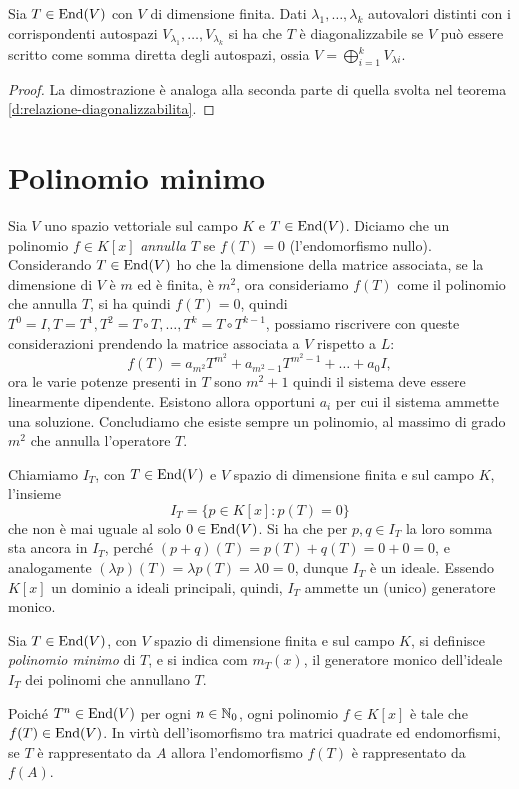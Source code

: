 \begin{teorema}
	Sia $T\in \operatorname{End}(V)$ con $V$ di dimensione finita.
	Dati $\lambda_1,\dots,\lambda_k$ autovalori distinti con i corrispondenti autospazi $V_{\lambda_1},\dots,V_{\lambda_k}$ si ha che $T$ è diagonalizzabile se $V$ può essere scritto come somma diretta degli autospazi, ossia $V =\bigoplus_{i=1}^k V_{\lambda i}$.
\end{teorema}
\begin{proof}
	La dimostrazione è analoga alla seconda parte di quella svolta nel teorema \ref{d:relazione-diagonalizzabilita}.
\end{proof}

\section{Polinomio minimo}
Sia $V$ uno spazio vettoriale sul campo $K$ e $T\in \operatorname{End}(V)$.
Diciamo che un polinomio $f\in K[x]$ \emph{annulla} $T$ se $f(T) = 0$ (l'endomorfismo nullo).
Considerando $T\in \operatorname{End}(V)$ ho che la dimensione della matrice associata, se la dimensione di $V$ è $m$ ed è finita, è $m^2$, ora consideriamo $f(T)$ come il polinomio che annulla $T$, si ha quindi $f(T) = 0$, quindi $T^0 = I,T=T^1, T^2=T\circ T, \dots, T^k = T\circ T^{k-1}$, possiamo riscrivere con queste considerazioni prendendo la matrice associata a $V$ rispetto a $L$:
\begin{equation*}
	f(T) = a_{m^2}T^{m^2} +a_{m^2-1}T^{m^2-1}+\dots+a_0I,
\end{equation*}
ora le varie potenze presenti in $T$ sono $m^2+1$ quindi il sistema deve essere linearmente dipendente.
Esistono allora opportuni $a_i$ per cui il sistema ammette una soluzione.
Concludiamo che esiste sempre un polinomio, al massimo di grado $m^2$ che annulla l'operatore $T$.

Chiamiamo $I_T$, con  $T\in \operatorname{End}(V)$ e $V$ spazio di dimensione finita e sul campo $K$, l'insieme
\begin{equation*}
	I_T = \{ p\in K[x]\colon p(T) = 0 \}
\end{equation*}
che non è mai uguale al solo $0\in \operatorname{End}(V)$.
Si ha che per $p,q\in I_T$ la loro somma sta ancora in $I_T$, perch\'e $(p+q)(T)=p(T)+q(T)=0+0=0$, e analogamente $(\lambda p)(T)=\lambda p(T)=\lambda 0=0$, dunque $I_T$ è un ideale.
Essendo $K[x]$ un dominio a ideali principali, quindi, $I_T$ ammette un (unico) generatore monico.
\begin{definizione} \label{d:polinomio-minimo}
	Sia $T\in \operatorname{End}(V)$, con $V$ spazio di dimensione finita e sul campo $K$, si definisce \emph{polinomio minimo} di $T$, e si indica com $m_T(x)$, il generatore monico dell'ideale $I_T$ dei polinomi che annullano $T$.
\end{definizione}
Poich\'e $T^n\in\operatorname{End}(V)$ per ogni $n\in\mathbb{N}_0$, ogni polinomio $f\in K[x]$ è tale che $f(T)\in\operatorname{End}(V)$.
In virtù dell'isomorfismo tra matrici quadrate ed endomorfismi, se $T$ è rappresentato da $A$ allora l'endomorfismo $f(T)$ è rappresentato da $f(A)$.

